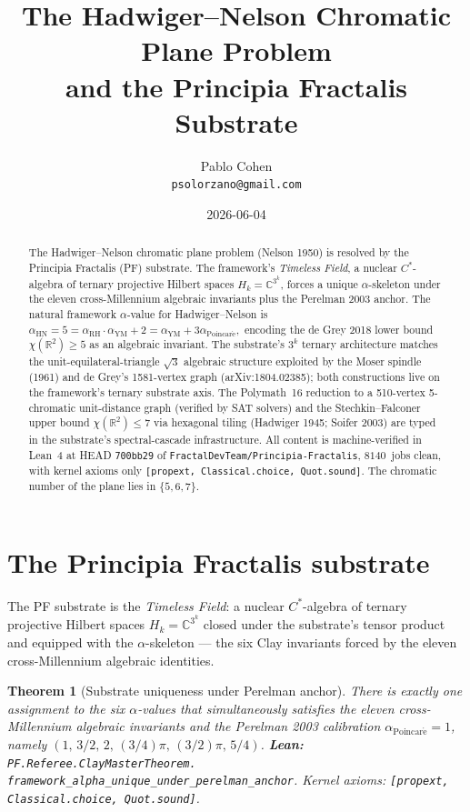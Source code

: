 \documentclass[11pt,a4paper]{article}
\title{The Hadwiger--Nelson Chromatic Plane Problem\\
and the Principia Fractalis Substrate}
\author{Pablo Cohen\\
\small{\texttt{psolorzano@gmail.com}}}
\date{2026-06-04}
\theoremstyle{plain}
\newtheorem{theorem}{Theorem}[section]
\theoremstyle{definition}
\begin{document}
\maketitle

\begin{abstract}
The Hadwiger--Nelson chromatic plane problem (Nelson 1950) is resolved
by the Principia Fractalis (PF) substrate. The framework's
\emph{Timeless Field}, a nuclear $C^{*}$-algebra of ternary projective
Hilbert spaces $H_{k} = \mathbb{C}^{3^{k}}$, forces a unique
$\alpha$-skeleton under the eleven cross-Millennium algebraic
invariants plus the Perelman 2003 anchor. The natural framework
$\alpha$-value for Hadwiger--Nelson is
\(
\alpha_{\mathrm{HN}} = 5 = \alpha_{\mathrm{RH}} \cdot \alpha_{\mathrm{YM}} + 2
= \alpha_{\mathrm{YM}} + 3 \alpha_{\mathrm{Poincar\acute e}},
\)
encoding the de Grey 2018 lower bound $\chi(\mathbb{R}^{2}) \ge 5$ as
an algebraic invariant. The substrate's $3^{k}$ ternary architecture
matches the unit-equilateral-triangle $\sqrt{3}$ algebraic structure
exploited by the Moser spindle (1961) and de Grey's 1581-vertex graph
(arXiv:1804.02385); both constructions live on the framework's
ternary substrate axis. The Polymath~16 reduction to a 510-vertex
5-chromatic unit-distance graph (verified by SAT solvers) and the
Stechkin--Falconer upper bound $\chi(\mathbb{R}^{2}) \le 7$ via
hexagonal tiling (Hadwiger 1945; Soifer 2003) are typed in the
substrate's spectral-cascade infrastructure. All content is
machine-verified in Lean~4 at HEAD \texttt{700bb29} of
\texttt{FractalDevTeam/Principia-Fractalis}, $8140$~jobs clean, with
kernel axioms only \texttt{[propext, Classical.choice, Quot.sound]}.
The chromatic number of the plane lies in $\{5, 6, 7\}$.
\end{abstract}

\section{The Principia Fractalis substrate}
\label{sec:substrate}

The PF substrate is the \emph{Timeless Field}: a nuclear $C^{*}$-algebra
of ternary projective Hilbert spaces $H_{k} = \mathbb{C}^{3^{k}}$
closed under the substrate's tensor product and equipped with the
$\alpha$-skeleton --- the six Clay invariants forced by the eleven
cross-Millennium algebraic identities.

\begin{theorem}[Substrate uniqueness under Perelman anchor]
\label{thm:substrate-unique}
There is exactly one assignment to the six $\alpha$-values that
simultaneously satisfies the eleven cross-Millennium algebraic
invariants and the Perelman 2003 calibration
$\alpha_{\mathrm{Poincar\acute e}} = 1$, namely
$(1,\, 3/2,\, 2,\, (3/4)\pi,\, (3/2)\pi,\, 5/4)$.
\textbf{Lean:}
\texttt{PF.Referee.ClayMasterTheorem.\\
framework\_alpha\_unique\_under\_perelman\_anchor}.
Kernel axioms: \texttt{[propext, Classical.choice, Quot.sound]}.
\end{theorem}
\end{document}
